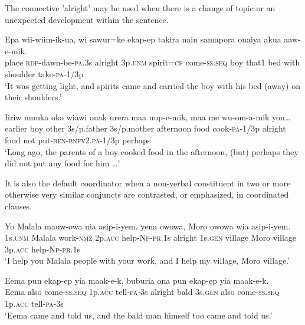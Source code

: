 The connective  'alright' may be used when there is a change of topic or an unexpected development within the sentence.

\ea%
\label{ex:8:x1376}
\gll Epa  wii-wiim-ik-ua,    wi  sawur=ke  ekap-ep  takira  nain  samapora  onaiya  akua  aaw-e-mik.\\
place  \textsc{rdp}-dawn-be-\textsc{pa}.3s  alright  3p.\textsc{unm}  spirit=\textsc{cf}  come-\textsc{ss}.\textsc{seq} boy  that1  bed  with  shoulder  take-\textsc{pa}-1/3p    \\
\glt`It was getting light, and spirits came and carried the boy with his bed (away) on their shoulders.'
\z


\ea%
\label{ex:8:x1377}
\gll Iiriw  muuka  oko  wiawi  onak  urera  maa uup-e-mik,    maa  me  wu-om-a-mik  yon{\dots} \\
earlier  boy  other  3s/p.father  3s/p.mother  afternoon  food cook-\textsc{pa}-1/3p  alright  food  not  put-\textsc{ben}-\textsc{bnfy}2.\textsc{pa}-1/3p  perhaps     \\
\glt`Long ago, the parents of a boy cooked food in the afternoon, (but) perhaps they did not put any food for him {\dots}'
\z


It is also the default coordinator when a non-verbal constituent in two or more otherwise very similar conjuncts are contrasted, or emphasized, in coordinated clauses.

\ea%
\label{ex:8:x1379}
\gll Yo  Malala  mauw-owa  nia  asip-i-yem,   yena  owowa,  Moro  owowa  wia  asip-i-yem.\\
1s.\textsc{unm}  Malala  work-\textsc{nmz}  2p.\textsc{acc}  help-\textsc{Np}-\textsc{pr}.1s  alright 1s.\textsc{gen}  village  Moro  village  3p.\textsc{acc}  help-\textsc{Np}-\textsc{pr}.1s     \\
\glt`I help you Malala people with your work, and I help my village, Moro village.'
\z


\ea%
\label{ex:8:x1380}
\gll Eema  pun  ekap-ep  yia  maak-e-k,    buburia  ona pun  ekap-ep  yia  maak-e-k. \\
Eema  also  come-\textsc{ss}.\textsc{seq}  1p.\textsc{acc}  tell-\textsc{pa}-3s  alright  bald  3s.\textsc{gen} also  come-\textsc{ss}.\textsc{seq}  1p.\textsc{acc}  tell-\textsc{pa}-3s     \\
\glt`Eema came and told us, and the bald man himself too came and told us.'
\z


